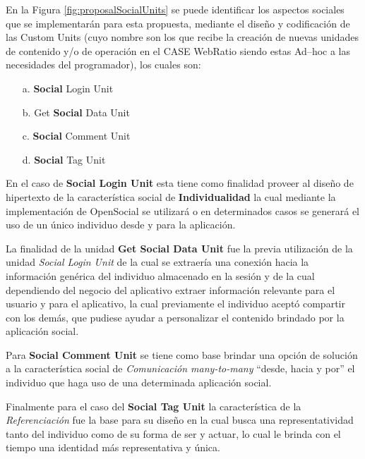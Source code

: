\documentclass[oneside,12pt,a4paper]{memoir}%
\begin{document}
		En la Figura \ref{fig:proposalSocialUnits} se puede identificar los aspectos
		sociales que se implementar\'an para esta propuesta, mediante el dise\~no y
		codificaci\'on de las Custom Units (cuyo nombre son los que recibe la
		creaci\'on de nuevas unidades de contenido y/o de operaci\'on en el \ac{CASE}
		WebRatio siendo estas Ad--hoc a las necesidades del programador), los cuales son:
		
		\begin{itemize}
		  \item[a.] \textbf{Social} Login Unit
		  \item[b.] Get \textbf{Social} Data Unit
		  \item[c.] \textbf{Social} Comment Unit
		  \item[d.] \textbf{Social} Tag Unit
		\end{itemize}
				
		En el caso de \textbf{Social Login Unit} esta tiene como finalidad proveer al
		dise\~no de hipertexto de la caracter\'istica social de \textbf{Individualidad}
		la cual mediante la implementaci\'on de OpenSocial se utilizar\'a o en
		determinados casos se generar\'a el uso de un \'unico individuo desde y para
		la aplicaci\'on.
		
		La finalidad de la unidad \textbf{Get Social Data Unit} fue la previa
		utilizaci\'on de la unidad \textit{Social Login Unit} de la cual se
		extraer\'ia una conexi\'on hacia la informaci\'on gen\'erica del individuo almacenado en
		la sesi\'on y de la cual dependiendo del negocio del aplicativo extraer
		informaci\'on relevante para el usuario y para el aplicativo, la cual
		previamente el individuo acept\'o compartir con los dem\'as, que pudiese
		ayudar a personalizar el contenido brindado por la aplicaci\'on social.
		
		Para \textbf{Social Comment Unit} se tiene como base brindar una opci\'on de
		soluci\'on a la caracter\'istica social de \textit{Comunicaci\'on many-to-many}
		``desde, hacia y por'' el individuo que haga uso de una determinada aplicaci\'on
		social.
		
		Finalmente para el caso del \textbf{Social Tag Unit} la caracter\'istica de la
		\textit{Referenciaci\'on} fue la base para su dise\~no en la cual busca una
		representatividad tanto del individuo como de su forma de ser y actuar, lo cual
		le brinda con el tiempo una identidad m\'as representativa y \'unica.
		
\end{document}
